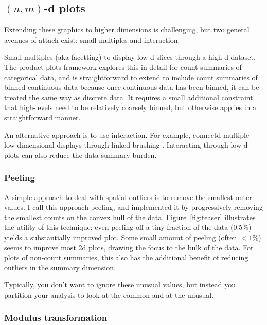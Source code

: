 \documentclass[journal]{vgtc}                %
\begin{document}
\subsection{\texorpdfstring{$(n, m)$}{(n, m)}-d plots}
\label{sub:nd-plots}

Extending these graphics to higher dimensions is challenging, but two general avenues of attach exist: small multiples and interaction.

Small multiples (aka facetting) to display low-d slices through a high-d dataset. The product plots \citep{me:prodplots} framework explores this in detail for count summaries of categorical data, and is straightforward to extend to include count summaries of binned continuous data because once continuous data has been binned, it can be treated the same way as discrete data. It requires a small additional constraint that high-levels need to be relatively coarsely binned, but otherwise applies in a straightforward manner.

An alternative approach is to use interaction. For example, connectd multiple low-dimensional displays through linked brushing \citep{liu:2013,swayne:2003}.  Interacting through low-d plots can also reduce the data summary burden.

\subsubsection{Peeling}
\label{sub:peeling}

A simple approach to deal with spatial outliers is to remove the smallest outer values. I call this approach peeling, and implemented it by progressively removing the smallest counts on the convex hull of the data. Figure~\ref{fig:teaser} illustrates the utility of this technique: even peeling off a tiny fraction of the data (0.5\%) yields a substantially improved plot. Some small amount of peeling (often $< 1\%$) seems to improve most 2d plots, drawing the focus to the bulk of the data. For plots of non-count summaries, this also has the additional benefit of reducing outliers in the summary dimension. 

Typically, you don't want to ignore these unusual values, but instead you partition your analysis to look at the common and at the unusual.

\subsubsection{Modulus transformation}
\label{sub:mt}
\end{document}
